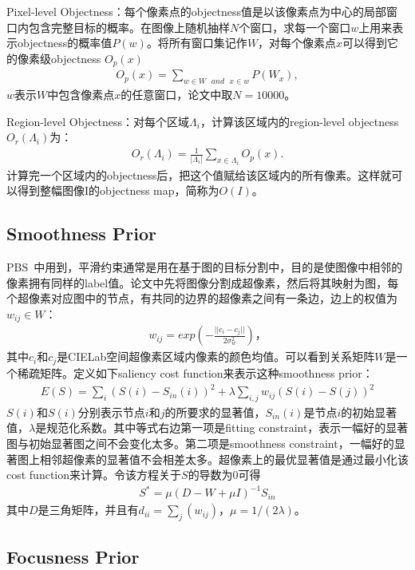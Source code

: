 \documentclass[12pt]{article}
\begin{document}
Pixel-level Objectness：每个像素点的objectness值是以该像素点为中心的局部窗口内包含完整目标的概率。在图像上随机抽样$N$个窗口，求每一个窗口$w$上用来表示objectness的概率值$P(w)$。将所有窗口集记作$W$，对每个像素点$x$可以得到它的像素级objectness $O_p(x)$
\begin{align}
O_p(x) = \sum_{w \in W \text{ }and \text{ } x \in w} P(W_x),
\end{align}
$w$表示$W$中包含像素点$x$的任意窗口，论文中取$N=10000$。

Region-level Objectness：对每个区域$\Lambda_i$，计算该区域内的region-level objectness $O_r(\Lambda_i)$为：
\begin{align}
O_r(\Lambda_i) = \frac{1}{|\Lambda_i|}\sum_{x \in \Lambda_i} O_p(x).
\end{align}
计算完一个区域内的objectness后，把这个值赋给该区域内的所有像素。这样就可以得到整幅图像I的objectness map，简称为$O(I)$。

\subsection{Smoothness Prior}

PBS~\cite{yang2013graph}中用到，平滑约束通常是用在基于图的目标分割中，目的是使图像中相邻的像素拥有同样的label值。论文中先将图像分割成超像素，然后将其映射为图，每个超像素对应图中的节点，有共同的边界的超像素之间有一条边，边上的权值为$w_{ij} \in W$：
\begin{align}
w_{ij} = exp\left(-\frac{||c_i-c_j||}{2\sigma_w^2}\right)，
\end{align}
其中$c_i$和$c_j$是CIELab空间超像素区域内像素的颜色均值。可以看到关系矩阵$W$是一个稀疏矩阵。定义如下saliency cost function来表示这种smoothness prior：
\begin{align}
E(S) = \sum_i(S(i)-S_{in}(i))^2+\lambda\sum_{i,j}w_{ij}(S(i)-S(j))^2
\end{align}
$S(i)$和$S(i)$分别表示节点$i$和$j$的所要求的显著值，$S_{in}(i)$是节点$i$的初始显著值，$\lambda$是规范化系数。其中等式右边第一项是fitting constraint，表示一幅好的显著图与初始显著图之间不会变化太多。第二项是smoothness constraint，一幅好的显著图上相邻超像素的显著值不会相差太多。超像素上的最优显著值是通过最小化该cost function来计算。令该方程关于$S$的导数为0可得
\begin{align}
S^* = \mu (D-W+\mu I)^{-1}S_{in}
\end{align}
其中$D$是三角矩阵，并且有$d_{ii} = \sum_j (w_{ij})$，$\mu = 1/(2\lambda)$。

\subsection{Focusness Prior}
\end{document}
